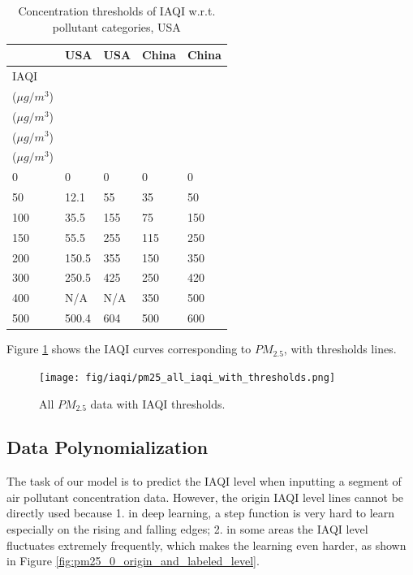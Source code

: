 \documentclass[sigconf]{acmart}
\begin{document}
\begin{table}[!htbp]
    \centering
    \caption{Concentration thresholds of IAQI w.r.t. pollutant categories, USA}
    \label{table:IAQI_thresholds}
    \begin{tabular}{l|l|l|l|l}
        \hline
        \hline
        \  & USA & USA & China & China \\ \hline
        IAQI & \makecell[c]{$PM_{2.5}$ \\ ($\mu g/m^3$)} & \makecell[c]{$PM_{10}$ \\ ($\mu g/m^3$)} & \makecell[c]{$PM_{2.5}$ \\ ($\mu g/m^3$)} & \makecell[c]{$PM_{10}$ \\ ($\mu g/m^3$)} \\ \hline
        0    & 0     & 0   & 0   & 0   \\ \hline
        50   & 12.1  & 55  & 35  & 50  \\ \hline
        100  & 35.5  & 155 & 75  & 150 \\ \hline
        150  & 55.5  & 255 & 115 & 250 \\ \hline
        200  & 150.5 & 355 & 150 & 350 \\ \hline
        300  & 250.5 & 425 & 250 & 420 \\ \hline
        400  & N/A   & N/A & 350 & 500 \\ \hline
        500  & 500.4 & 604 & 500 & 600 \\ \hline
        \hline
    \end{tabular}
\end{table}

Figure \ref{fig:pm25_all_iaqi_with_thresholds} shows the IAQI curves corresponding to $PM_{2.5}$, with thresholds lines.

\begin{figure}[!htbp]
    \begin{center}
        \texttt{[image: fig/iaqi/pm25\_all\_iaqi\_with\_thresholds.png]}
    \end{center}
    \caption{All $PM_{2.5}$ data with IAQI thresholds.}
    \label{fig:pm25_all_iaqi_with_thresholds}
\end{figure}

\subsection{Data Polynomialization}

The task of our model is to predict the IAQI level when inputting a segment of air pollutant concentration data. However, the origin IAQI level lines cannot be directly used because 1. in deep learning, a step function is very hard to learn especially on the rising and falling edges; 2. in some areas the IAQI level fluctuates extremely frequently, which makes the learning even harder, as shown in Figure \ref{fig:pm25_0_origin_and_labeled_level}.
\end{document}
